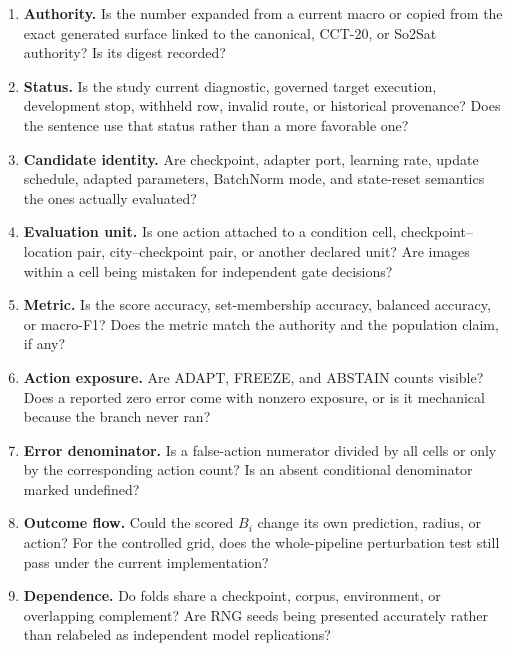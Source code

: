 \begin{enumerate}
  \item \textbf{Authority.} Is the number expanded from a current macro or copied from the exact
  generated surface linked to the canonical, CCT-20, or So2Sat authority?  Is its digest recorded?

  \item \textbf{Status.} Is the study current diagnostic, governed target execution, development
  stop, withheld row, invalid route, or historical provenance?  Does the sentence use that status
  rather than a more favorable one?

  \item \textbf{Candidate identity.} Are checkpoint, adapter port, learning rate, update schedule,
  adapted parameters, BatchNorm mode, and state-reset semantics the ones actually evaluated?

  \item \textbf{Evaluation unit.} Is one action attached to a condition cell,
  checkpoint--location pair, city--checkpoint pair, or another declared unit?  Are images within a
  cell being mistaken for independent gate decisions?

  \item \textbf{Metric.} Is the score accuracy, set-membership accuracy, balanced accuracy, or
  macro-F1?  Does the metric match the authority and the population claim, if any?

  \item \textbf{Action exposure.} Are ADAPT, FREEZE, and ABSTAIN counts visible?  Does a reported
  zero error come with nonzero exposure, or is it mechanical because the branch never ran?

  \item \textbf{Error denominator.} Is a false-action numerator divided by all cells or only by the
  corresponding action count?  Is an absent conditional denominator marked undefined?

  \item \textbf{Outcome flow.} Could the scored $B_i$ change its own prediction, radius, or action?
  For the controlled grid, does the whole-pipeline perturbation test still pass under the current
  implementation?

  \item \textbf{Dependence.} Do folds share a checkpoint, corpus, environment, or overlapping
  complement?  Are RNG seeds being presented accurately rather than relabeled as independent model
  replications?


\end{enumerate}
